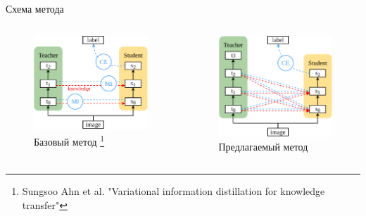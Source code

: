 \documentclass{beamer}
\begin{document}

\begin{frame}{Схема метода}

    \begin{columns}[c]
        \begin{figure}
            \includegraphics[width=1.0\textwidth]{ahn_diagram.pdf}
            \caption{Базовый метод \footnote{Sungsoo Ahn et al. "Variational information distillation for knowledge transfer"}}
        \end{figure}

        \begin{figure}
            \includegraphics[width=1.0\textwidth]{our_diagram.pdf}
            \caption{Предлагаемый метод}
        \end{figure}
    \end{columns}


\end{frame}
\end{document}
